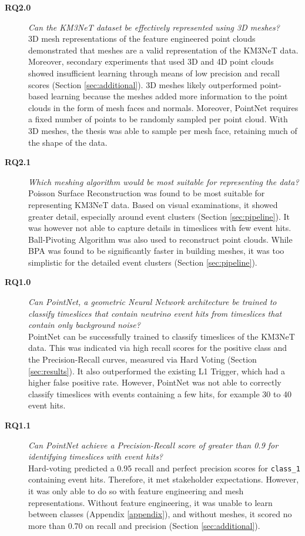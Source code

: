 \begin{description}
    \item[\textbf{RQ2.0}] \textit{Can the KM3NeT dataset be effectively represented using 3D meshes?} \\
    3D mesh representations of the feature engineered point clouds demonstrated that meshes are a valid representation of the KM3NeT data. Moreover, secondary experiments that used 3D and 4D point clouds showed insufficient learning through means of low precision and recall scores (Section \ref{sec:additional}). 3D meshes likely outperformed point-based learning because the meshes added more information to the point clouds in the form of mesh faces and normals. Moreover, PointNet requires a fixed number of points to be randomly sampled per point cloud. With 3D meshes, the thesis was able to sample per mesh face, retaining much of the shape of the data. 
    
    \item[\textbf{RQ2.1}] \textit{Which meshing algorithm would be most suitable for representing the data?}  \\
    Poisson Surface Reconstruction was found to be most suitable for representing KM3NeT data. Based on visual examinations, it showed greater detail, especially around event clusters (Section \ref{sec:pipeline}). It was however not able to capture details in timeslices with few event hits. Ball-Pivoting Algorithm was also used to reconstruct point clouds. While BPA was found to be significantly faster in building meshes, it was too simplistic for the detailed event clusters (Section \ref{sec:pipeline}). 
    
    \item[\textbf{RQ1.0}] \textit{Can PointNet, a geometric Neural Network architecture be trained to classify timeslices that contain neutrino event hits from timeslices that contain only background noise?} \\
    PointNet can be successfully trained to classify timeslices of the KM3NeT data. This was indicated via high recall scores for the positive class and the Precision-Recall curves, measured via Hard Voting (Section \ref{sec:results}). It also outperformed the existing L1 Trigger, which had a higher false positive rate. However, PointNet was not able to correctly classify timeslices with events containing a few hits, for example 30 to 40 event hits. 
    
    \item[\textbf{RQ1.1}] \textit{Can PointNet achieve a Precision-Recall score of greater than 0.9 for identifying timeslices with event hits?} \\
    Hard-voting predicted a 0.95 recall and perfect precision scores for  \texttt{class\_1} containing event hits. Therefore, it met stakeholder expectations. However, it was only able to do so with feature engineering and mesh representations. Without feature engineering, it was unable to learn between classes (Appendix \ref{appendix}), and without meshes, it scored no more than 0.70 on recall and precision (Section \ref{sec:additional}). 
     

\end{description}
